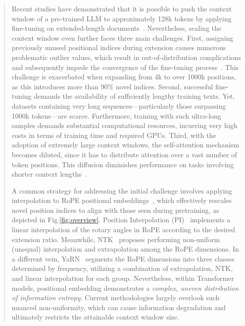 \begin{abstract}
Recent studies have demonstrated that it is possible to push the context window of a pre-trained LLM to approximately 128k tokens by applying fine-tuning on extended-length documents~\cite{longlora,pi,yarn,zhang2024soaring,liu2023scaling}. Nevertheless, scaling the context window even further faces three main challenges. First, assigning previously unused positional indices during extension causes numerous problematic outlier values, which result in out-of-distribution complications and subsequently impede the convergence of the fine-tuning process~\cite{pi}. This challenge is exacerbated when expanding from 4k to over 1000k positions, as this introduces more than 90\% novel indices. Second, successful fine-tuning demands the availability of sufficiently lengthy training texts. Yet, datasets containing very long sequences—particularly those surpassing 1000k tokens—are scarce. Furthermore, training with such ultra-long samples demands substantial computational resources, incurring very high costs in terms of training time and required GPUs. Third, with the adoption of extremely large context windows, the self-attention mechanism becomes diluted, since it has to distribute attention over a vast number of token positions. This diffusion diminishes performance on tasks involving shorter context lengths~\cite{pi}.

A common strategy for addressing the initial challenge involves applying interpolation to RoPE positional embeddings~\cite{rope,pi}, which effectively rescales novel position indices to align with those seen during pretraining, as depicted in Fig.\ref{fig:overview}. Position Interpolation (PI)~\cite{pi} implements a linear interpolation of the rotary angles in RoPE according to the desired extension ratio. Meanwhile, NTK~\cite{ntk,dynamicntk} proposes performing non-uniform (unequal) interpolation and extrapolation among the RoPE dimensions. In a different vein, YaRN~\cite{yarn} segments the RoPE dimensions into three classes determined by frequency, utilizing a combination of extrapolation, NTK, and linear interpolation for each group. Nevertheless, within Transformer models, positional embedding demonstrates a \emph{complex, uneven distribution of information entropy}. Current methodologies largely overlook such nuanced non-uniformity, which can cause information degradation and ultimately restricts the attainable context window size.


\end{abstract}
